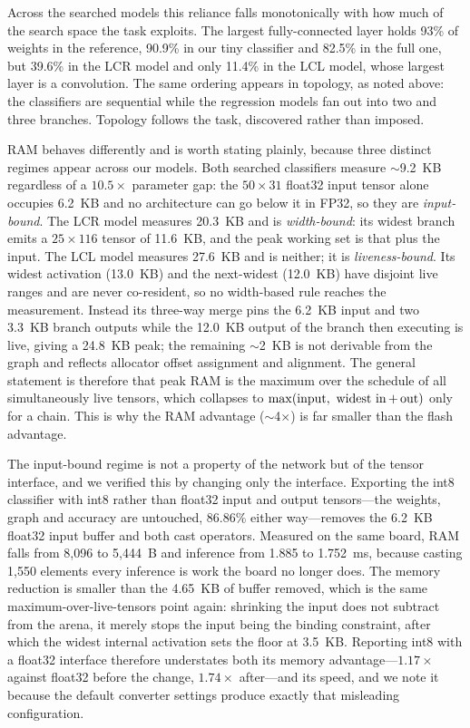 \documentclass[journal]{IEEEtran}
\begin{document}
Across the searched models this reliance falls monotonically with how much of
the search space the task exploits. The largest fully-connected layer holds 93\%
of weights in the reference, 90.9\% in our tiny classifier and 82.5\% in the full
one, but 39.6\% in the LCR model and only 11.4\% in the LCL model, whose largest
layer is a convolution. The same ordering appears in topology, as noted above:
the classifiers are sequential while the regression models fan out into two and
three branches. Topology follows the task, discovered rather than imposed.

RAM behaves differently and is worth stating plainly, because three distinct
regimes appear across our models. Both searched classifiers measure
$\sim$9.2~KB regardless of a $10.5\times$ parameter gap: the $50\times31$ float32
input tensor alone occupies 6.2~KB and no architecture can go below it in FP32,
so they are \emph{input-bound}. The LCR model measures 20.3~KB and is
\emph{width-bound}: its widest branch emits a $25\times116$ tensor of 11.6~KB,
and the peak working set is that plus the input. The LCL model measures 27.6~KB
and is neither; it is \emph{liveness-bound}. Its widest activation (13.0~KB) and
the next-widest (12.0~KB) have disjoint live ranges and are never co-resident,
so no width-based rule reaches the measurement. Instead its three-way merge pins
the 6.2~KB input and two 3.3~KB branch outputs while the 12.0~KB output of the
branch then executing is live, giving a 24.8~KB peak; the remaining $\sim$2~KB
is not derivable from the graph and reflects allocator offset assignment and
alignment. The
general statement is therefore that peak RAM is the maximum over the schedule of
all simultaneously live tensors, which collapses to
$\max(\text{input},\ \text{widest in\,+\,out})$ only for a chain. This is why the
RAM advantage ($\sim$4$\times$) is far smaller than the flash advantage.

The input-bound regime is not a property of the network but of the tensor
interface, and we verified this by changing only the interface. Exporting the
int8 classifier with int8 rather than float32 input and output tensors---the
weights, graph and accuracy are untouched, $86.86\%$ either way---removes the
6.2~KB float32 input buffer and both cast operators. Measured on the same board,
RAM falls from 8,096 to 5,444~B and inference from 1.885 to 1.752~ms, because
casting 1,550 elements every inference is work the board no longer does. The
memory reduction is smaller than the 4.65~KB of buffer removed,
which is the same maximum-over-live-tensors point again: shrinking the input
does not subtract from the arena, it merely stops the input being the binding
constraint, after which the widest internal activation sets the floor at
3.5~KB. Reporting int8 with a float32 interface therefore understates both its
memory advantage---$1.17\times$ against float32 before the change, $1.74\times$
after---and its speed, and we note it because the default converter settings
produce exactly that misleading configuration.
\end{document}
